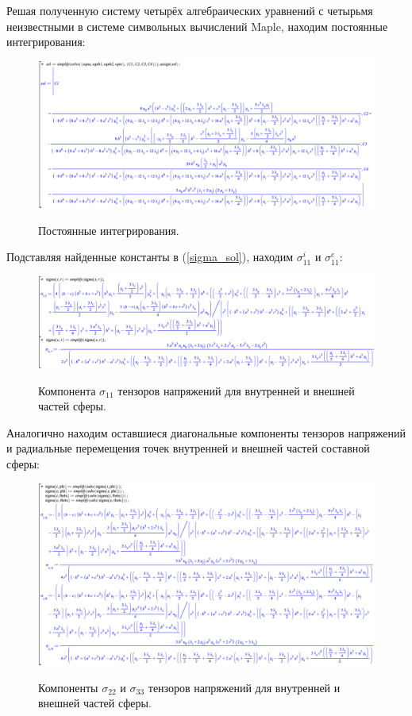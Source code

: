 \documentclass[a4paper,12pt]{article}	%
\begin{document}
Решая полученную систему четырёх алгебраических уравнений с четырьмя неизвестными в системе символьных вычислений Maple, находим постоянные интегрирования:
\begin{figure}[H]
  \centering
  \includegraphics[scale=0.47]{img/IntConst_Lab1.png}\\
  \caption{Постоянные интегрирования.}
  \label{fig_2}
\end{figure}


Подставляя найденные константы в (\ref{sigma_sol}), находим $\sigma_{11}^{i}$ и $\sigma_{11}^{e}$:
\begin{figure}[H]
  \centering
  \includegraphics[scale=0.45]{img/Sigma11_Lab1.png}\\
  \caption{Компонента $\sigma_{11}$ тензоров напряжений для внутренней и внешней частей сферы.}
  \label{fig_3}
\end{figure}

Аналогично находим оставшиеся диагональные компоненты тензоров напряжений и радиальные перемещения точек внутренней и внешней частей составной сферы:

\begin{figure}[H]
  \centering
  \includegraphics[scale=0.47]{img/Sigma_theta_Lab1.png}\\
  \caption{Компоненты $\sigma_{22}$ и $\sigma_{33}$ тензоров напряжений для внутренней и внешней частей сферы.}
  \label{fig_4}
\end{figure}
\end{document}

